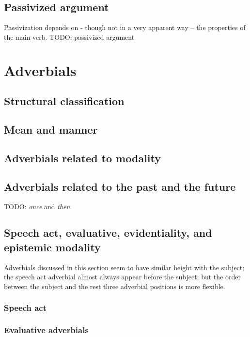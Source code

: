 \documentclass[UTF8, a4paper, oneside, scheme=plain, 12pt]{ctexbook}
\newcommand{\form}[1]{\emph{#1}}
\begin{document}
\subsection{Passivized argument}

Passivization depends on - though not in a very apparent way -- the properties of the main verb. 
TODO: passivized argument

\section{Adverbials}\label{sec:verb-phrase.adverbial}

\subsection{Structural classification}

\subsection{Mean and manner}

\subsection{Adverbials related to modality}

\subsection{Adverbials related to the past and the future}

TODO: \form{once} and \form{then}

\subsection{Speech act, evaluative, evidentiality, and epistemic modality}

Adverbials discussed in this section seem to have similar height 
with the subject; 
the speech act adverbial almost always appear before the subject;
but the order between the subject and the rest three adverbial positions 
is more flexible.

\subsubsection{Speech act}



\subsubsection{Evaluative adverbials}
\end{document}
